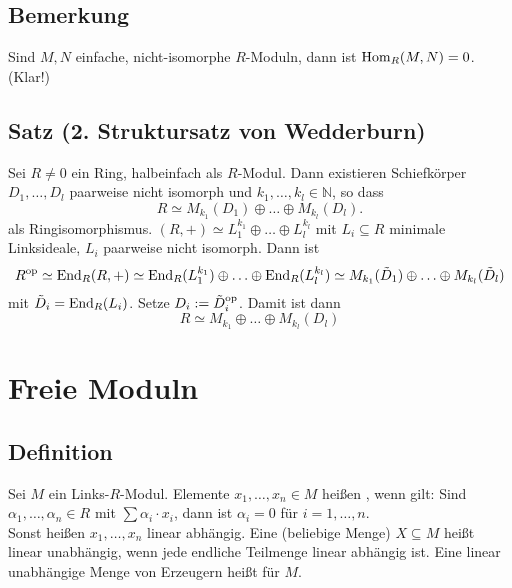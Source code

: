 \subsection[Bemerkung: Einfache, nicht-isomorphe $R$-Moduln]{Bemerkung} %
\label{sub:230}
Sind $M,N$ einfache, nicht-isomorphe $R$-Moduln, dann ist $\operatorname{Hom}_R(M,N) = 0$. (Klar!)

\subsection{Satz (2. Struktursatz von Wedderburn)} %
\label{sub:231}
Sei $R \not= 0$ ein Ring, halbeinfach als $R$-Modul. Dann existieren Schiefkörper $D_1, \ldots , D_l$ paarweise nicht isomorph und $k_1, \ldots , k_l \in \mathds{N}$, so
dass 
\[
	R \simeq M_{k_1}(D_1) \oplus \ldots \oplus M_{k_l}(D_l).
\]
als Ringisomorphismus.
$(R,+) \simeq L_1^{k_1} \oplus \ldots \oplus L_l^{k_l}$ mit $L_i \subseteq R$ minimale Linksideale, $L_i$ paarweise nicht isomorph. Dann ist 
\[
	R^{\mathrm{op}} \simeq \operatorname{End}_R(R,+) \simeq \operatorname{End}_R(L_1^{k_1}) \oplus \ldots \oplus \operatorname{End}_R(L_l^{k_l})  \simeq M_{k_1}(\tilde D_1) \oplus \ldots \oplus M_{k_l}(\tilde D_l)
\]
mit $\tilde D_i = \operatorname{End}_R(L_i)$. Setze $D_i := \tilde D_i^{\mathrm{op}}$. Damit ist dann 
\[
	R \simeq M_{k_1} \oplus \ldots \oplus M_{k_l}(D_l)
\]
\section*{Freie Moduln}

\subsection[Definition: linear unabhängig und Basen]{Definition} %
\label{sub:232}
Sei $M$ ein Links-$R$-Modul. Elemente $x_1, \ldots , x_n \in M$ heißen , wenn gilt: Sind $\alpha_1, \ldots , \alpha_n \in R$ mit 
$\sum \alpha_i \cdot x_i$, dann ist $\alpha_i = 0$ für $i=1, \ldots ,n$. \\
Sonst heißen $x_1, \ldots , x_n$ linear abhängig. Eine (beliebige Menge) $X \subseteq M$ heißt linear unabhängig, wenn jede endliche Teilmenge linear abhängig ist. Eine 
linear unabhängige Menge von Erzeugern heißt  für $M$. 

